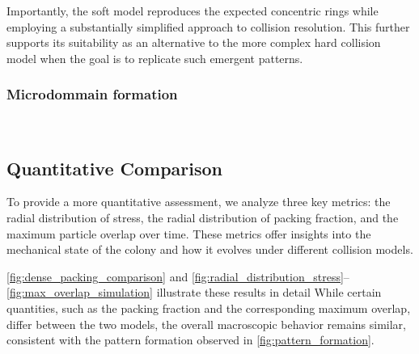 \documentclass[conference]{IEEEtran}
\begin{document}
Importantly, the soft model reproduces the expected concentric rings while employing a substantially simplified approach to collision resolution. This further supports its suitability as an alternative to the more complex hard collision model when the goal is to replicate such emergent patterns.



\subsubsection{Microdommain formation}

~\cite{You2018}


\subsection{Quantitative Comparison}

To provide a more quantitative assessment, we analyze three key metrics: the radial distribution of stress, the radial distribution of packing fraction, and the maximum particle overlap over time. These metrics offer insights into the mechanical state of the colony and how it evolves under different collision models.

\autoref{fig:dense_packing_comparison} and \autoref{fig:radial_distribution_stress}--\autoref{fig:max_overlap_simulation} illustrate these results in detail While certain quantities, such as the packing fraction and the corresponding maximum overlap, differ between the two models, the overall macroscopic behavior remains similar, consistent with the pattern formation observed in \autoref{fig:pattern_formation}.
\end{document}
